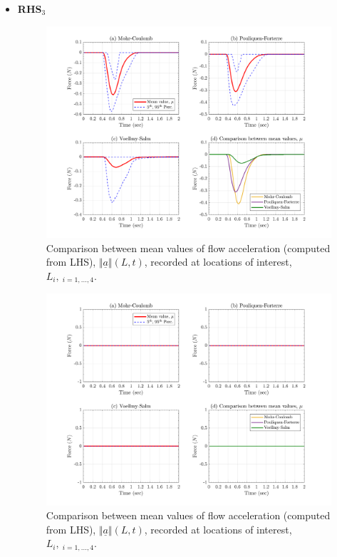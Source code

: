 \documentclass{article}
\begin{document}
\begin{itemize}
\newpage
\item	\textbf{RHS$_3$}

\begin{figure}[H]
        \centering
        \includegraphics[width=1\textwidth]{InclinedPlane/Forces_Powers/RHS3/FRHS3x.png}
        \caption{Comparison between mean values of flow acceleration (computed from LHS), $\Vert \underline{a} \Vert(L,t)$, recorded at locations of interest, $L_i, \ _{i=1,...,4}$.}
        \label{fig:Ramp-RHS3-Fx-spatial}
\end{figure}

\begin{figure}[H]
        \centering
        \includegraphics[width=1\textwidth]{InclinedPlane/Forces_Powers/RHS3/FRHS3y.png}
        \caption{Comparison between mean values of flow acceleration (computed from LHS), $\Vert \underline{a} \Vert(L,t)$, recorded at locations of interest, $L_i, \ _{i=1,...,4}$.}
        \label{fig:Ramp-RHS3-Fy-spatial}
\end{figure}


\end{itemize}
\end{document}
